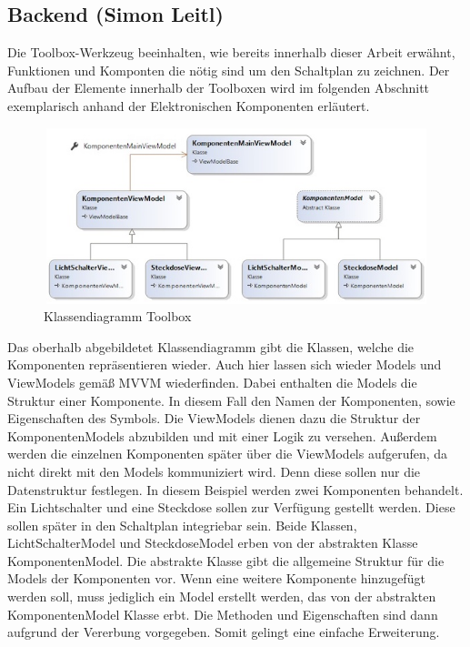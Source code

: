 \subsection{Backend (Simon Leitl)}
Die Toolbox-Werkzeug beeinhalten, wie bereits innerhalb dieser Arbeit erwähnt, Funktionen und Komponten die nötig sind um den Schaltplan zu zeichnen. Der Aufbau der Elemente innerhalb der Toolboxen wird im folgenden Abschnitt exemplarisch anhand der Elektronischen Komponenten erläutert. 
\begin{figure}[hb]
    \centering
    \includegraphics[width=500px,height=193px]{5Implementierungen/Bilder/ClassDiagram1}
    \caption{Klassendiagramm Toolbox}
    \label{pic:klassendiagramm-toolbox}
\end{figure}
\linebreak
Das oberhalb abgebildetet Klassendiagramm gibt die Klassen, welche die Komponenten repräsentieren wieder. Auch hier lassen sich wieder Models und ViewModels gemäß MVVM wiederfinden. Dabei enthalten die Models die Struktur einer Komponente. In diesem Fall den Namen der Komponenten, sowie Eigenschaften des Symbols. Die ViewModels dienen dazu die Struktur der KomponentenModels abzubilden und mit einer Logik zu versehen. Außerdem werden die einzelnen Komponenten später über die ViewModels aufgerufen, da nicht direkt mit den Models kommuniziert wird. Denn diese sollen nur die Datenstruktur festlegen.
In diesem Beispiel werden zwei Komponenten behandelt. Ein Lichtschalter und eine Steckdose sollen zur Verfügung gestellt werden. Diese sollen später in den Schaltplan integriebar sein. Beide Klassen, LichtSchalterModel und SteckdoseModel erben von der abstrakten Klasse KomponentenModel. Die abstrakte Klasse gibt die allgemeine Struktur für die Models der Komponenten vor. Wenn eine weitere Komponente hinzugefügt werden soll, muss jediglich ein Model erstellt werden, das von der abstrakten KomponentenModel Klasse erbt. Die Methoden und Eigenschaften sind dann aufgrund der Vererbung vorgegeben. Somit gelingt eine einfache Erweiterung.
\pagebreak
